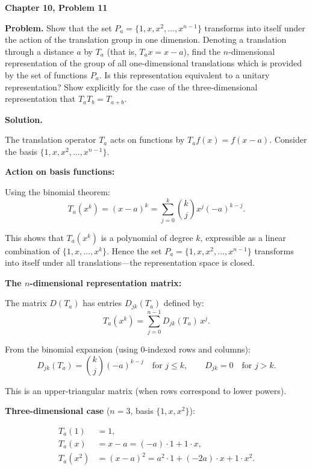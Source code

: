 \documentclass[12pt]{article}
\begin{document}
\begin{center}
{\Large\bfseries Chapter 10, Problem 11}
\end{center}

\noindent\textbf{Problem.} Show that the set $P_a = \{1, x, x^2, \ldots, x^{n-1}\}$ transforms into itself under the action of the translation group in one dimension. Denoting a translation through a distance $a$ by $T_a$ (that is, $T_a x = x - a$), find the $n$-dimensional representation of the group of all one-dimensional translations which is provided by the set of functions $P_a$. Is this representation equivalent to a unitary representation? Show explicitly for the case of the three-dimensional representation that $T_a T_b = T_{a+b}$.

\bigskip
\noindent\textbf{Solution.}

The translation operator $T_a$ acts on functions by $T_a f(x) = f(x - a)$. Consider the basis $\{1, x, x^2, \ldots, x^{n-1}\}$.

\medskip
\noindent\textbf{Action on basis functions:}

Using the binomial theorem:
\[
T_a(x^k) = (x-a)^k = \sum_{j=0}^{k} \binom{k}{j} x^j (-a)^{k-j}.
\]

This shows that $T_a(x^k)$ is a polynomial of degree $k$, expressible as a linear combination of $\{1, x, \ldots, x^k\}$. Hence the set $P_a = \{1, x, x^2, \ldots, x^{n-1}\}$ transforms into itself under all translations---the representation space is closed.

\medskip
\noindent\textbf{The $n$-dimensional representation matrix:}

The matrix $D(T_a)$ has entries $D_{jk}(T_a)$ defined by:
\[
T_a(x^k) = \sum_{j=0}^{n-1} D_{jk}(T_a)\, x^j.
\]

From the binomial expansion (using $0$-indexed rows and columns):
\[
D_{jk}(T_a) = \binom{k}{j}(-a)^{k-j} \quad \text{for } j \leq k, \qquad D_{jk} = 0 \quad \text{for } j > k.
\]

This is an upper-triangular matrix (when rows correspond to lower powers).

\medskip
\noindent\textbf{Three-dimensional case} ($n = 3$, basis $\{1, x, x^2\}$):

\begin{align*}
T_a(1) &= 1, \\
T_a(x) &= x - a = (-a)\cdot 1 + 1\cdot x, \\
T_a(x^2) &= (x-a)^2 = a^2 \cdot 1 + (-2a)\cdot x + 1\cdot x^2.
\end{align*}
\end{document}
